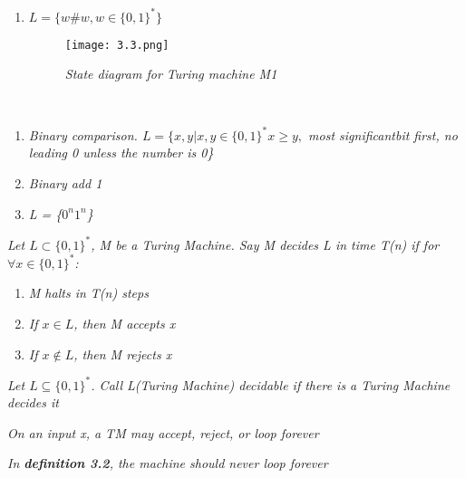 \documentclass{article}
\begin{document}
\begin{example}
\begin{enumerate}
        \item \textit{$L = \{w\#w,w\in\{0,1\}^*\}$}

        \begin{figure}[H]
            \begin{center}
                \texttt{[image: 3.3.png]}
            \end{center}
            \caption{\textit{State diagram for Turing machine M1}}
        \end{figure}
    \end{enumerate}
\end{example}

\begin{exercises}
    \

    \begin{enumerate}
        \item \textit{Binary comparison. $L = \{x,y|x,y\in\{0,1\}^*x\geq y,$ most significantbit first, no leading 0 unless the number is 0\}}
        \item \textit{Binary add 1}
        \item \textit{L = \{$0^n1^n$\}}
    \end{enumerate}
\end{exercises}

\begin{defn}
    \textit{Let $L\subset \{0,1\}^*$, M be a Turing Machine. Say M decides L in time T(n) if for $\forall x \in \{0,1\}^*$:}

    \begin{enumerate}
        \item \textit{M halts in T(n) steps}
        \item \textit{If $x\in L$, then M accepts x}
        \item \textit{If $x\notin L$, then M rejects x}
    \end{enumerate}
\end{defn}

\begin{defn}
    \textit{Let $L\subseteq \{0,1\}^*$. Call L(Turing Machine) decidable if there is a Turing Machine decides it}
\end{defn}

\begin{remark}
    \textit{On an input x, a TM may accept, reject, or loop forever}

    \textit{In \textbf{definition 3.2}, the machine should never loop forever}
\end{remark}
\end{document}
